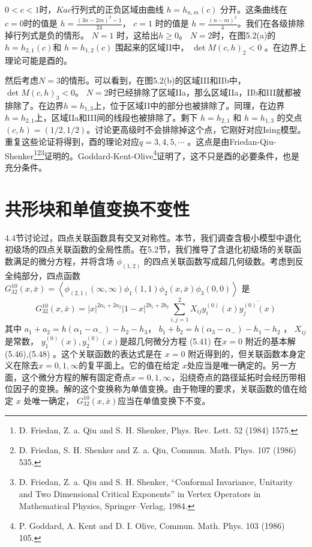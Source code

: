 $0<c<1 $时，$Kac$行列式的正负区域由曲线 $h=h_{n, m}(c)$ 分开。这条曲线在 $c=0 $时的值是 $h=\frac{(3 n-2 m)^{2}-1}{24} $， $c=1$ 时的值是 $h=\frac{(n-m)^{2}}{4} $。我们在各级排除掉行列式是负的情形。 $N=1$ 时，这给出$ h\geq 0 $。 $N=2 $时，在图5.2(a)的 $h=h_{2,1}(c) $和 $h=h_{1,2}(c)$ 围起来的区域II中， $\det M(c, h)_{2}<0$ 。在边界上理论可能是酉的。

然后考虑$ N=3 $的情形。可以看到，在图5.2(b)的区域III和IIb中， $\det M(c, h)_{3}<0 $。 $N=2 $时已经排除了区域IIa，那么区域IIa，IIb和III就都被排除了。在边界$ h=h_{1,3} $上，位于区域II中的部分也被排除了。同理，在边界 $h=h_{2,1} $上，区域IIa和III间的线段也被排除了。剩下 $h=h_{2,1}$ 和 $h=h_{1,3}$ 的交点$ (c,h)=(1/2,1/2) $。讨论更高级时不会排除掉这个点，它刚好对应Ising模型。重复这些论证将得到，酉的理论对应$ q=3,4,5,\cdots$ 。这点是由Friedan-Qiu-Shenker\footnote{D. Friedan, Z. a. Qiu and S. H. Shenker, Phys. Rev. Lett. 52 (1984) 1575.}\footnote{D. Friedan, S. H. Shenker and Z. a. Qiu, Commun. Math. Phys. 107 (1986) 535.}\footnote{D. Friedan, Z. a. Qiu and S. H. Shenker, “Conformal Invariance, Unitarity and Two Dimensional Critical Exponents” in Vertex Operators in Mathematical Physics, Springer–Verlag, 1984.}证明的。Goddard-Kent-Olive\footnote{P. Goddard, A. Kent and D. I. Olive, Commun. Math. Phys. 103 (1986) 105.}证明了，这不只是酉的必要条件，也是充分条件。

\section{共形块和单值变换不变性}
4.4节讨论过，四点关联函数具有交叉对称性。本节，我们调查含极小模型中退化初级场的四点关联函数的全局性质。在5.2节，我们推导了含退化初级场的关联函数满足的微分方程，并将含场 $\phi_{(1,2)}$ 的四点关联函数写成超几何级数。考虑到反全纯部分，四点函数$ G_{32}^{10}(x, \bar{x})=\left\langle\phi_{(2,1)}(\infty, \infty) \phi_{1}(1,1) \phi_{2}(x, \bar{x}) \phi_{3}(0,0)\right\rangle$ 是
\begin{equation}
	G_{32}^{10}(x, \bar{x})=|x|^{2 a_{1}+2 a_{2}}|1-x|^{2 b_{1}+2 b_{2}} \sum_{i, j=1}^{2} X_{i j} y_{i}^{(0)}(x) \overline{y_{j}^{(0)}(x)} 
\end{equation}
其中 $a_{1}+a_{2}=h\left(\alpha_{1}-\alpha_{-}\right)-h_{2}-h_{3} $， $b_{1}+b_{2}=h\left(\alpha_{3}-\alpha_{-}\right)-h_{1}-h_{2}$ ， $X_{ij}$ 是常数， $y_{1}^{(0)}(x), y_{2}^{(0)}(x) $是超几何微分方程 (5.41) 在$ x=0$ 附近的基本解 (5.46),(5.48) 。这个关联函数的表达式是在 $x=0$ 附近得到的，但关联函数本身定义在除去$ x=0,1,\infty $的复平面上。它的值在给定 $x $处应当是唯一确定的。另一方面，这个微分方程的解有固定奇点$ x=0,1,\infty $，沿绕奇点的路径延拓时会经历带相位因子的变换。解的这个变换称为单值变换。由于物理的要求，关联函数的值在给定 $x$ 处唯一确定， $G_{32}^{10}(x, \bar{x}) $应当在单值变换下不变。

